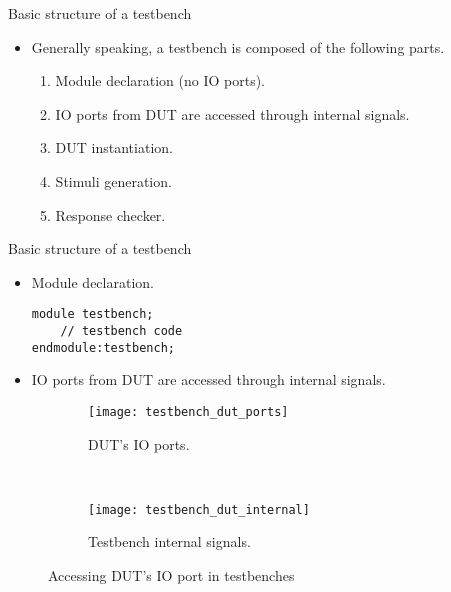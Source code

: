 %
\begin{frame}{Basic structure of a testbench}{}
\begin{itemize}
\item Generally speaking, a testbench is composed of the following parts.
\begin{enumerate}
\item Module declaration (no \ac{IO} ports).
\item \ac{IO} ports from \ac{DUT} are accessed through internal signals.
\item \ac{DUT} instantiation.
\item Stimuli generation.
\item Response checker.
\end{enumerate}
\end{itemize}
\end{frame}

%
\begin{frame}{Basic structure of a testbench}{}
\begin{itemize}
\item Module declaration.
\lstset{numbers=none, xleftmargin=.1\textwidth, xrightmargin=.1\textwidth}
\begin{lstlisting}
module testbench;
    // testbench code
endmodule:testbench;
\end{lstlisting}
\end{itemize}
\end{frame}

%
\begin{frame}{}{}
\begin{itemize}
\item \ac{IO} ports from \ac{DUT} are accessed through internal signals.
\end{itemize}
   \vspace{-5pt}
\begin{figure}
  \centering
  \begin{subfigure}{\textwidth}
    \centering
     \texttt{[image: testbench\_dut\_ports]}
     \caption{\ac{DUT}'s \ac{IO} ports.}
     \label{Figure:DUT_IO_ports}
  \end{subfigure}
  \\
 \vspace{-5pt}
  \begin{subfigure}{\textwidth}
    \centering
    \texttt{[image: testbench\_dut\_internal]}
    \caption{Testbench internal signals.}
    \label{Figure:Testbench_internal_signals}
  \end{subfigure}
  \vspace{-12pt}
  \caption{Accessing \ac{DUT}'s \ac{IO} port in testbenches}
  \label{Figure:DUT_IOs}
\end{figure}
\end{frame}

